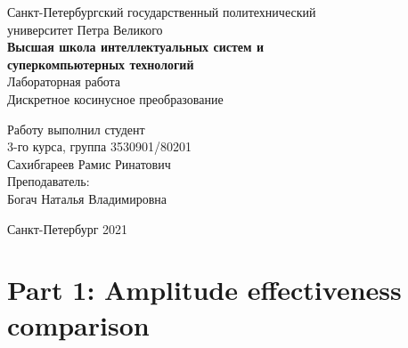 \documentclass[a4paper]{article}
\begin{document}
    \begin{center}
        \begin{center}
        \hfill \break
        \normalsize{Санкт-Петербургский государственный политехнический}\\
        \normalsize{университет Петра Великого}\\
        \hfill \break
        \normalsize{\textbf{Высшая школа интеллектуальных систем и}}\\ 
        \normalsize{\textbf{суперкомпьютерных технологий}}\\ 
        \hfill \break
        \hfill \break
        \hfill \break
        \normalsize{Лабораторная работа}\\
        \hfill \break
        \hfill \break
        \normalsize{\LARGE Дискретное косинусное преобразование}\\
        \end{center}
        \hfill \break
        \hfill \break
        \hfill \break
        \hfill \break
        \hfill \break
        \hfill \break
        \hfill \break
        \hfill \break
        \hfill \break
        \hfill \break
        \begin{flushright}
            \normalsize{Работу выполнил студент}\\
            \normalsize{3-го курса, группа 3530901/80201}\\
            \normalsize{Сахибгареев Рамис Ринатович}\\
            \hfill \break
            \normalsize{Преподаватель:}\\
            \normalsize{Богач Наталья Владимировна}\\
        \end{flushright}
        \hfill \break
        \hfill \break
        \hfill \break
        \hfill \break
        \begin{center} Санкт-Петербург 2021 \end{center}
        \thispagestyle{empty}
    \end{center}
    
    \newpage
        \tableofcontents
    
    \newpage
         \listoffigures
    
    \newpage
         \lstlistoflistings   
     
    \newpage
        \section{Part 1: Amplitude effectiveness comparison}
        
\end{document}

